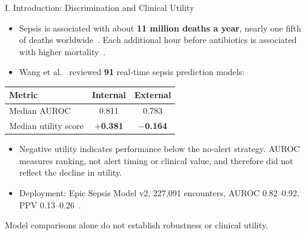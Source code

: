 \begin{frame}{I. Introduction: Discrimination and Clinical Utility}
\begin{itemize}\itemsep2pt\small
  \item Sepsis is associated with about \textbf{11 million deaths a year},
        nearly one fifth of deaths worldwide~\cite{rudd2020global}. Each
        additional hour before antibiotics is associated with higher
        mortality~\cite{seymour2017time}.
  \item Wang et al.~\cite{wang2025srpm} reviewed \textbf{91} real-time sepsis
        prediction models:
\end{itemize}

\begin{center}\tablestyle\footnotesize
\begin{tabular}{lcc}
\toprule
\textbf{Metric} & \textbf{Internal} & \textbf{External} \\
\midrule
Median AUROC         & 0.811            & 0.783 \\
Median utility score & \textbf{$+$0.381} & \textbf{$-$0.164} \\
\bottomrule
\end{tabular}
\end{center}

\begin{itemize}\itemsep2pt\small
  \item Negative utility indicates performance below the no-alert strategy.
        AUROC measures ranking, not alert timing or clinical value, and
        therefore did not reflect the decline in utility.
  \item Deployment: Epic Sepsis Model v2, 227,091 encounters, AUROC
        0.82--0.92, PPV 0.13--0.26~\cite{wong2026epic}.
\end{itemize}

\vfill
\begin{alertblock}{}
  \centering\small Model comparisons alone do not establish robustness or
  clinical utility.
\end{alertblock}
\end{frame}
